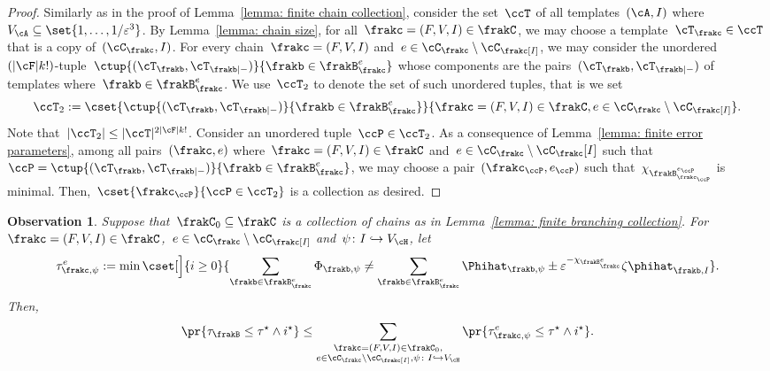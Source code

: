 \documentclass[11pt]{amsart}
\newcommand{\eps}{\varepsilon}
\DeclarePairedDelimiter{\abs}{\lvert}{\rvert}
\newcommand{\injection}{\hookrightarrow}
\newcommand{\om}{\mathord{-}}
\newtheorem{observation}[algocf]{Observation}
\theoremstyle{definition}
\numberwithin{equation}{section}
\begin{document}
	\begin{proof}
		Similarly as in the proof of Lemma~\ref{lemma: finite chain collection}, consider the set~$\ccT$ of all templates~$(\cA,I)$ where~$V_\cA\subseteq\set{1,\ldots,1/\eps^3}$.
		By Lemma~\ref{lemma: chain size}, for all~$\frakc=(F,V,I)\in\frakC$, we may choose a template~$\cT_\frakc\in\ccT$ that is a copy of~$(\cC_\frakc,I)$.
		For every chain~$\frakc=(F,V,I)$ and~$e\in\cC_\frakc\setminus\cC_\frakc[I]$, we may consider the unordered~$(\abs{\cF}k!)$-tuple~$\ctup{(\cT_\frakb,\cT_{\frakb|\om})}{\frakb\in\frakB_\frakc^e}$ whose components are the pairs~$(\cT_\frakb,\cT_{\frakb|\om})$ of templates where~$\frakb\in\frakB_\frakc^e$.
		We use~$\ccT_2$ to denote the set of such unordered tuples, that is we set
		\begin{equation*}
			\ccT_2:=\cset{ \ctup{ (\cT_\frakb,\cT_{\frakb|\om}) }{ \frakb\in \frakB_\frakc^e } }{ \frakc=(F,V,I)\in\frakC,e\in\cC_\frakc\setminus\cC_\frakc[I] }.
		\end{equation*}
		Note that~$\abs{\ccT_2}\leq \abs{\ccT}^{2\abs{\cF}k!}$.
		Consider an unordered tuple~$\ccP\in\ccT_2$.
		As a consequence of Lemma~\ref{lemma: finite error parameters}, among all pairs~$(\frakc,e)$ where~$\frakc=(F,V,I)\in\frakC$ and~$e\in\cC_{\frakc}\setminus\cC_{\frakc}[I]$ such that~$\ccP=\ctup{ (\cT_\frakb,\cT_{\frakb|-}) }{ \frakb\in \frakB_\frakc^e }$, we may choose a pair~$(\frakc_\ccP,e_\ccP)$ such that~$\chi_{\frakB_{\frakc_\ccP}^{e_\ccP}}$ is minimal.
		Then,~$\cset{\frakc_\ccP}{ \ccP\in\ccT_2 }$ is a collection as desired.
	\end{proof}
	
	\begin{observation}\label{observation: family individual}
		Suppose that~$\frakC_0\subseteq\frakC$ is a collection of chains as in Lemma~\ref{lemma: finite branching collection}.
		For~$\frakc=(F,V,I)\in\frakC$,~$e\in\cC_\frakc\setminus\cC_\frakc[I]$ and~$\psi\colon I\injection V_\cH$, let
		\begin{equation*}
			\tau_{\frakc,\psi}^e:=\min\cset[\Big]{ i\geq 0 }{ \sum_{\frakb\in\frakB_\frakc^e}\Phi_{\frakb,\psi}\neq \sum_{\frakb\in\frakB_\frakc^e}\Phihat_{\frakb,\psi}\pm \eps^{-\chi_{\frakB_\frakc^e}}\zeta\phihat_{\frakb,I} }.
		\end{equation*}
		Then,
		\begin{equation*}
			\pr{\tau_\frakB\leq \tau^\star\wedge i^\star}
			\leq \sum_{\substack{\frakc=(F,V,I)\in\frakC_0,\\e\in\cC_\frakc\setminus\cC_\frakc[I], \psi\colon I\injection V_\cH}}\pr{ \tau_{\frakc,\psi}^e\leq \tau^\star\wedge i^\star }.
		\end{equation*}
	\end{observation}
	
\end{document}

